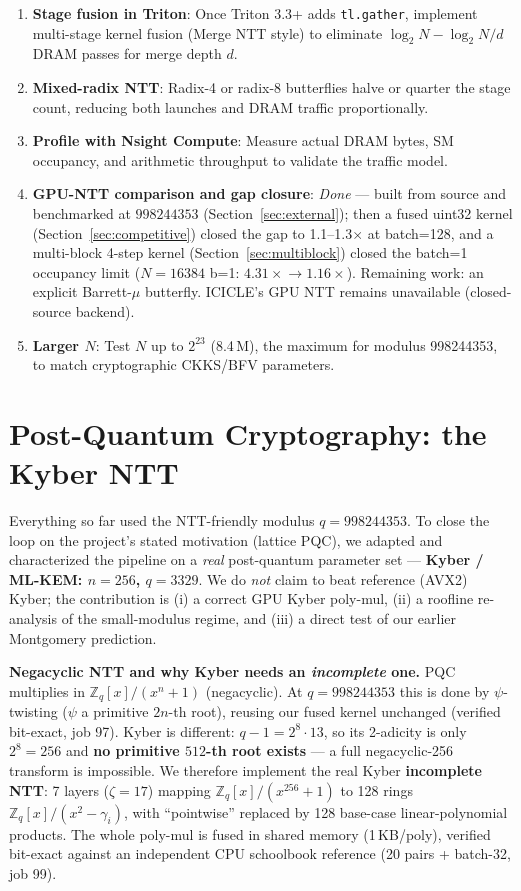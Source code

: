\documentclass[11pt,a4paper]{article}
\begin{document}
\begin{enumerate}
  \item \textbf{Stage fusion in Triton}: Once Triton 3.3+ adds \texttt{tl.gather},
    implement multi-stage kernel fusion (Merge NTT style) to eliminate $\log_2
    N - \log_2 N / d$ DRAM passes for merge depth $d$.
  \item \textbf{Mixed-radix NTT}: Radix-4 or radix-8 butterflies halve or quarter the
    stage count, reducing both launches and DRAM traffic proportionally.
  \item \textbf{Profile with Nsight Compute}: Measure actual DRAM bytes, SM occupancy,
    and arithmetic throughput to validate the traffic model.
  \item \textbf{GPU-NTT comparison and gap closure}: \emph{Done} — built from source and
    benchmarked at $998244353$ (Section~\ref{sec:external}); then a fused uint32 kernel
    (Section~\ref{sec:competitive}) closed the gap to 1.1--1.3$\times$ at batch=128, and a
    multi-block 4-step kernel (Section~\ref{sec:multiblock}) closed the batch=1 occupancy limit
    ($N{=}16384$ b=1: $4.31\times\!\to\!1.16\times$). Remaining work: an explicit Barrett-$\mu$
    butterfly. ICICLE's GPU NTT remains unavailable (closed-source backend).
  \item \textbf{Larger $N$}: Test $N$ up to $2^{23}$ (8.4\,M), the maximum for
    modulus 998244353, to match cryptographic CKKS/BFV parameters.
\end{enumerate}

\section{Post-Quantum Cryptography: the Kyber NTT}
\label{sec:pqc}

Everything so far used the NTT-friendly modulus $q=998244353$. To close the loop on the project's
stated motivation (lattice PQC), we adapted and characterized the pipeline on a \emph{real}
post-quantum parameter set --- \textbf{Kyber / ML-KEM: $n=256$, $q=3329$}. We do \emph{not} claim to
beat reference (AVX2) Kyber; the contribution is (i) a correct GPU Kyber poly-mul, (ii) a roofline
re-analysis of the small-modulus regime, and (iii) a direct test of our earlier Montgomery prediction.

\textbf{Negacyclic NTT and why Kyber needs an \emph{incomplete} one.} PQC multiplies in
$\mathbb{Z}_q[x]/(x^n+1)$ (negacyclic). At $q=998244353$ this is done by $\psi$-twisting ($\psi$ a
primitive $2n$-th root), reusing our fused kernel unchanged (verified bit-exact, job 97). Kyber is
different: $q-1 = 2^8\cdot 13$, so its 2-adicity is only $2^8=256$ and \textbf{no primitive $512$-th
root exists} --- a full negacyclic-256 transform is impossible. We therefore implement the real Kyber
\textbf{incomplete NTT}: 7 layers ($\zeta=17$) mapping $\mathbb{Z}_q[x]/(x^{256}+1)$ to 128 rings
$\mathbb{Z}_q[x]/(x^2-\gamma_i)$, with ``pointwise'' replaced by 128 base-case linear-polynomial
products. The whole poly-mul is fused in shared memory (1\,KB/poly), verified bit-exact against an
independent CPU schoolbook reference (20 pairs + batch-32, job 99).
\end{document}
